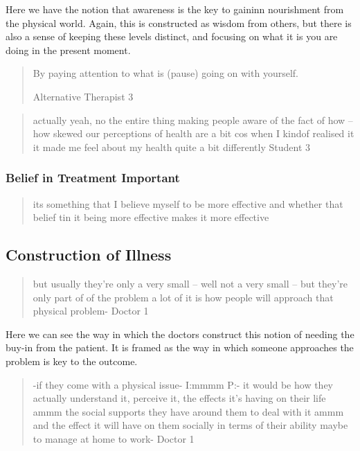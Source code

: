 Here we have the notion that awareness is the key to gaininn nourishment from the physical world. Again, this is constructed as wisdom from others, but there is also a sense of keeping these levels distinct, and focusing on what it is you are doing in the present moment. 

\begin{quotation}
  
By paying attention to what is (pause) going on with yourself.

Alternative Therapist 3
\end{quotation}

\begin{quotation}
  actually yeah, no the entire thing making people aware of the fact of how – how skewed our perceptions of health are a bit cos when I kindof realised it it made me feel about my health quite a bit differently
Student 3
\end{quotation}

\subsubsection{Belief in Treatment Important}
\begin{quotation}
  its something that I believe myself to be more effective and whether that belief tin it being more effective makes it more effective

\end{quotation}


\subsection{Construction of Illness}
\label{sec:construction-illness}

\begin{quotation}
  but usually they're only a very small – well not a very small – but they're only part of of the problem a lot of it is how people will approach that physical problem-
Doctor 1
\end{quotation}

Here  we can see the way in which the doctors construct this notion of needing the buy-in from the patient. It is framed as the way in which someone approaches the problem is key to the outcome. 

\begin{quotation}
  -if they come with a physical issue-
I:mmmm
P:- it would be how they actually understand it, perceive it, the effects it's having on their life ammm the social supports they have around them to deal with it ammm and the effect it will have on them socially in terms of their ability maybe to manage at home to work-
Doctor 1
\end{quotation}

